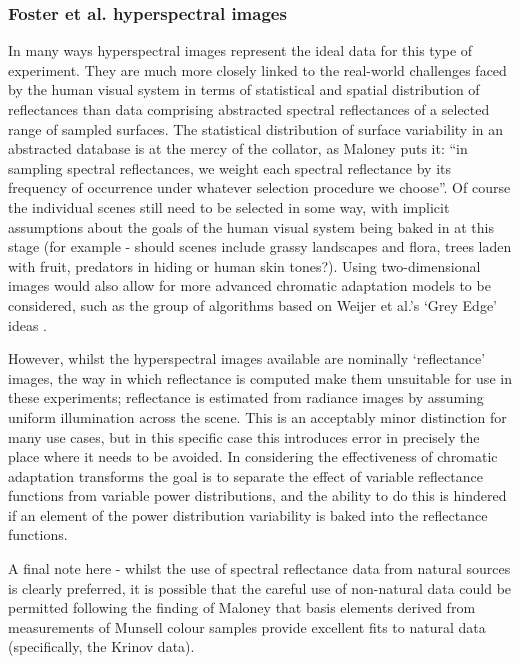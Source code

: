 \subsubsection*{Foster et al. hyperspectral images \cite{nascimento_statistics_2002,foster_frequency_2006}}
In many ways hyperspectral images represent the ideal data for this type of experiment. They are much more closely linked to the real-world challenges faced by the human visual system in terms of statistical and spatial distribution of reflectances than data comprising abstracted spectral reflectances of a selected range of sampled surfaces. The statistical distribution of surface variability in an abstracted database is at the mercy of the collator, as Maloney puts it: ``in sampling spectral reflectances, we weight each spectral reflectance by its frequency of occurrence under whatever selection procedure we choose''\cite{maloney_computational_1984}. Of course the individual scenes still need to be selected in some way, with implicit assumptions about the goals of the human visual system being baked in at this stage (for example - should scenes include grassy landscapes and flora, trees laden with fruit, predators in hiding or human skin tones?).
Using two-dimensional images would also allow for more advanced chromatic adaptation models to be considered, such as the group of algorithms based on Weijer et al.'s `Grey Edge' ideas \cite{weijer_edge-based_2007}. 

However, whilst the hyperspectral images available are nominally `reflectance' images, the way in which reflectance is computed make them unsuitable for use in these experiments; reflectance is estimated from radiance images by assuming uniform illumination across the scene. This is an acceptably minor distinction for many use cases, but in this specific case this introduces error in precisely the place where it needs to be avoided. In considering the effectiveness of chromatic adaptation transforms the goal is to separate the effect of variable reflectance functions from variable power distributions, and the ability to do this is hindered if an element of the power distribution variability is baked into the reflectance functions.

\bigskip



A final note here - whilst the use of spectral reflectance data from natural sources is clearly preferred, it is possible that the careful use of non-natural data could be permitted following the finding of Maloney \cite{maloney_evaluation_1986} that basis elements derived from measurements of Munsell colour samples provide excellent fits to natural data (specifically, the Krinov data). 